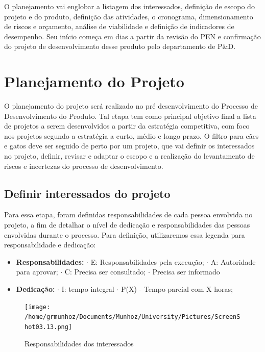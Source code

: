 \documentclass[
	12pt,				%
	openright,			%
	oneside,			%
	a4paper,			%
	english,			%
	french,				%
	spanish,			%
	brazil				%
	]{abntex2}
\begin{document}
O planejamento vai englobar a listagem dos interessados, definição de escopo do projeto e do produto, definição das atividades, o cronograma, dimensionamento de riscos e orçamento, análise de viabilidade e definição de indicadores de desempenho. Seu início começa em dias a partir da revisão do PEN e confirmação do projeto de desenvolvimento desse produto pelo departamento de P$\&$D.

\newpage
\chapter{Planejamento do Projeto}

O planejamento do projeto será realizado no pré desenvolvimento do Processo de Desenvolvimento do Produto. Tal etapa tem como principal objetivo final a lista de projetos a serem desenvolvidos a partir da estratégia competitiva, com foco nos projetos segundo a estratégia a curto, médio e longo prazo. O filtro para cães e gatos deve ser seguido de perto por um projeto, que vai definir os interessados no projeto, definir, revisar e adaptar o escopo e a realização do levantamento de riscos e incertezas do processo de desenvolvimento.

\section{Definir interessados do projeto}

Para essa etapa, foram definidas responsabilidades de cada pessoa envolvida no projeto, a fim de detalhar o nível de dedicação e responsabilidades das pessoas envolvidas durante o processo. Para definição, utilizaremos essa legenda para responsabilidade e dedicação:

\begin{itemize}
\item \textbf{Responsabilidades:}
\subitem $\cdot$ E: Responsabilidades pela execução;
\subitem $\cdot$ A: Autoridade para aprovar;
\subitem $\cdot$ C: Precisa ser consultado;
\subitem $\cdot$ Precisa ser informado
\item \textbf{Dedicação:}
\subitem $\cdot$ I: tempo integral
\subitem $\cdot$ P(X) - Tempo parcial com X horas;
\end{itemize}

\begin{figure}[H]
\begin{center}
\caption{Responsabilidades dos interessados}
\texttt{[image: /home/grmunhoz/Documents/Munhoz/University/Pictures/ScreenShot03.13.png]} 
\end{center}
\end{figure}
\end{document}
